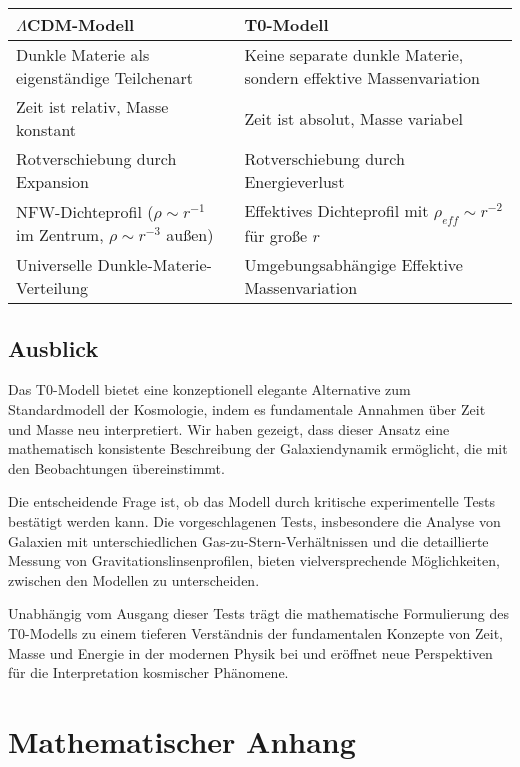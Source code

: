 \documentclass[a4paper,12pt]{article}
\begin{document}
	\begin{tcolorbox}[colback=yellow!5!white,colframe=yellow!75!black,title=Vergleich der Modelle]
		\begin{tabular}{|p{}|p{}|}
			\hline
			\textbf{$\Lambda$CDM-Modell} & \textbf{T0-Modell} \\
			\hline
			Dunkle Materie als eigenständige Teilchenart & Keine separate dunkle Materie, sondern effektive Massenvariation \\
			\hline
			Zeit ist relativ, Masse konstant & Zeit ist absolut, Masse variabel \\
			\hline
			Rotverschiebung durch Expansion & Rotverschiebung durch Energieverlust \\
			\hline
			NFW-Dichteprofil ($\rho \sim r^{-1}$ im Zentrum, $\rho \sim r^{-3}$ außen) & Effektives Dichteprofil mit $\rho_{eff} \sim r^{-2}$ für große $r$ \\
			\hline
			Universelle Dunkle-Materie-Verteilung & Umgebungsabhängige Effektive Massenvariation \\
			\hline
		\end{tabular}
	\end{tcolorbox}
	
	\subsection{Ausblick}
	
	Das T0-Modell bietet eine konzeptionell elegante Alternative zum Standardmodell der Kosmologie, indem es fundamentale Annahmen über Zeit und Masse neu interpretiert. Wir haben gezeigt, dass dieser Ansatz eine mathematisch konsistente Beschreibung der Galaxiendynamik ermöglicht, die mit den Beobachtungen übereinstimmt.
	
	Die entscheidende Frage ist, ob das Modell durch kritische experimentelle Tests bestätigt werden kann. Die vorgeschlagenen Tests, insbesondere die Analyse von Galaxien mit unterschiedlichen Gas-zu-Stern-Verhältnissen und die detaillierte Messung von Gravitationslinsenprofilen, bieten vielversprechende Möglichkeiten, zwischen den Modellen zu unterscheiden.
	
	Unabhängig vom Ausgang dieser Tests trägt die mathematische Formulierung des T0-Modells zu einem tieferen Verständnis der fundamentalen Konzepte von Zeit, Masse und Energie in der modernen Physik bei und eröffnet neue Perspektiven für die Interpretation kosmischer Phänomene.
	
	\appendix
	\section{Mathematischer Anhang}
	
\end{document}
